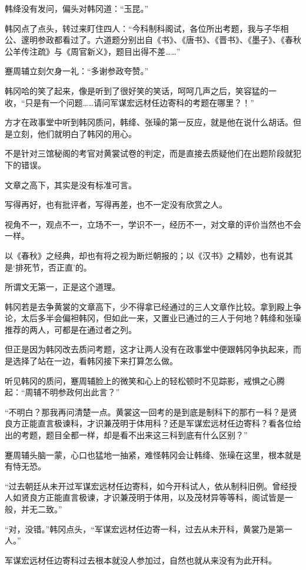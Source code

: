 韩绛没有发问，偏头对韩冈道：“玉昆。”

韩冈点了点头，转过来盯住四人：“今科制科阁试，各位所出考题，我与子华相公、邃明参政都看过了。六道题分别出自《书》、《唐书》、《晋书》、《墨子》、《春秋公羊传注疏》与《周官新义》，题目出得不差……”

蹇周辅立刻欠身一礼：“多谢参政夸赞。”

韩冈哈的笑了起来，像是听到了很好笑的笑话，呵呵几声之后，笑容猛的一收，“只是有一个问题……请问军谋宏远材任边寄科的考题在哪里？！”

方才在政事堂中听到韩冈质问，韩绛、张璪的第一反应，就是他在说什么胡话。但是立刻，他们就明白了韩冈的用心。

不是针对三馆秘阁的考官对黄裳试卷的判定，而是直接去质疑他们在出题阶段就犯下的错误。

文章之高下，其实是没有标准可言。

写得再好，也有批评者，写得再差，也不一定没有欣赏之人。

视角不一，观点不一，立场不一，学识不一，经历不一，对文章的评价当然也不会一样。

以《春秋》之经典，却也有将之视为断烂朝报的；以《汉书》之精妙，也有说其是‘排死节，否正直’的。

所谓文无第一，正是这个道理。

韩冈若是去争黄裳的文章高下，少不得拿已经通过的三人文章作比较。拿到殿上争论，太后多半会偏袒韩冈，但如此一来，又置业已通过的三人于何地？韩绛和张璪推荐的两人，可都是在通过者之列。

但正是因为韩冈改去质问考题，这才让两人没有在政事堂中便跟韩冈争执起来，而是选择了站在一边，看韩冈接下来打算怎么做。

听见韩冈的质问，蹇周辅脸上的微笑和心上的轻松顿时不见踪影，戒惧之心腾起：“周辅不明参政何出此言？”

“不明白？那我再问清楚一点。黄裳这一回考的是到底是制科下的那冇一科？是贤良方正能直言极谏科，才识兼茂明于体用科？还是军谋宏远材任边寄科？看各位给出的考题，题目全都一样，却是看不出来这三科到底有什么区别？”

蹇周辅头脑一蒙，心口也猛地一抽紧，难怪韩冈会让韩绛、张璪在这里，根本就是有恃无恐。

“过去朝廷从未开过军谋宏远材任边寄科，如今开科试人，依从制科旧例。曾经授人如贤良方正能直言极谏，才识兼茂明于体用，以及茂材异等等科，阁试皆是一般，并无二致。”

“对，没错。”韩冈点头，“军谋宏远材任边寄一科，过去从未开科，黄裳乃是第一人。”

军谋宏远材任边寄科过去根本就没人参加过，自然也就从来没有为此开科。

